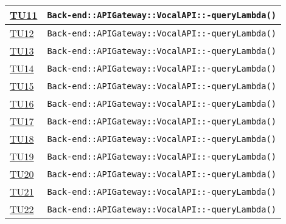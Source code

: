 \begin{longtable}{|>{\centering}m{1cm}|m{12cm}<{\centering}|}
\hyperlink{TU11}{TU11} & \texttt{Back-end::APIGateway::VocalAPI::-\linebreak queryLambda()}\\ \hline

\hyperlink{TU12}{TU12} & \texttt{Back-end::APIGateway::VocalAPI::-\linebreak queryLambda()}\\ \hline

\hyperlink{TU13}{TU13} & \texttt{Back-end::APIGateway::VocalAPI::-\linebreak queryLambda()}\\ \hline

\hyperlink{TU14}{TU14} & \texttt{Back-end::APIGateway::VocalAPI::-\linebreak queryLambda()}\\ \hline

\hyperlink{TU15}{TU15} & \texttt{Back-end::APIGateway::VocalAPI::-\linebreak queryLambda()}\\ \hline

\hyperlink{TU16}{TU16} & \texttt{Back-end::APIGateway::VocalAPI::-\linebreak queryLambda()}\\ \hline

\hyperlink{TU17}{TU17} & \texttt{Back-end::APIGateway::VocalAPI::-\linebreak queryLambda()}\\ \hline

\hyperlink{TU18}{TU18} & \texttt{Back-end::APIGateway::VocalAPI::-\linebreak queryLambda()}\\ \hline

\hyperlink{TU19}{TU19} & \texttt{Back-end::APIGateway::VocalAPI::-\linebreak queryLambda()}\\ \hline

\hyperlink{TU20}{TU20} & \texttt{Back-end::APIGateway::VocalAPI::-\linebreak queryLambda()}\\ \hline

\hyperlink{TU21}{TU21} & \texttt{Back-end::APIGateway::VocalAPI::-\linebreak queryLambda()}\\ \hline

\hyperlink{TU22}{TU22} & \texttt{Back-end::APIGateway::VocalAPI::-\linebreak queryLambda()}\\ \hline


\end{longtable}
